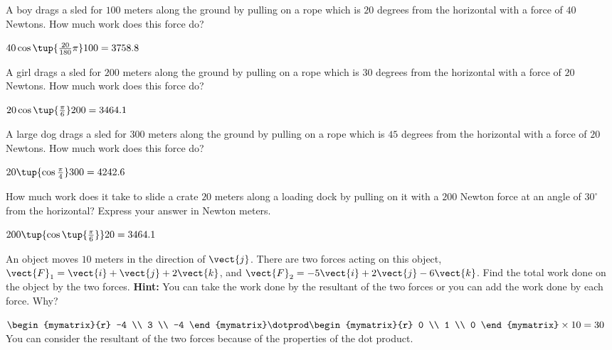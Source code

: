 \begin{enumialphparenastyle}

\begin{ex} A boy drags a sled for $100$ meters along the ground by pulling on a rope
which is $20$ degrees from the horizontal with a force of $40$ Newtons. How much
work does this force do?
\begin{sol}
$40\cos \tup{\frac{20}{180}\pi }100=3758.8  $
\end{sol}
\end{ex}

\begin{ex} A girl drags a sled for $200$ meters along the ground by pulling on a rope
which is $30$ degrees from the horizontal with a force of $20$ Newtons. How much
work does this force do?
\begin{sol}
$20\cos \tup{\frac{\pi }{6}}200= 3464.1 $
\end{sol}
\end{ex}

\begin{ex} A large dog drags a sled for $300$ meters along the ground by pulling on a
rope which is $45$ degrees from the horizontal with a force of $20$ Newtons. How
much work does this force do?
\begin{sol}
 $20\tup{\cos \frac{\pi }{4}}300=4242.6 $
\end{sol}
\end{ex}

\begin{ex} How much work does it take to slide a crate $20$ meters
along a loading dock by pulling on it with a $200$ Newton force at an angle of
$30^{\circ }$ from the horizontal? Express your answer in Newton meters. 
\begin{sol}
$200\tup{\cos \tup{\frac{\pi }{6}} } 20= 3464.1$
\end{sol}
\end{ex}

\begin{ex} An object moves $10$ meters in the direction of $\vect{j}$. There are
two forces acting on this object, $\vect{F}_{1}=\vect{i}+\vect{j}+
2\vect{k}$, and $\vect{F}_{2}=-5\vect{i}+2\vect{j}-6\vect{k}$. Find
the total work done on the object by the two forces. \textbf{Hint: }You can
take the work done by the resultant of the two forces or you can add the
work done by each force. Why?
\begin{sol}
 $\begin{mymatrix}{r}
 -4 \\
3 \\
-4
\end{mymatrix} \dotprod \begin{mymatrix}{r}
0 \\
1 \\
0
\end{mymatrix} \times 10= 30$ You can consider the resultant of the
two forces because of the properties of the dot product.
\end{sol}
\end{ex}


\end{enumialphparenastyle}
